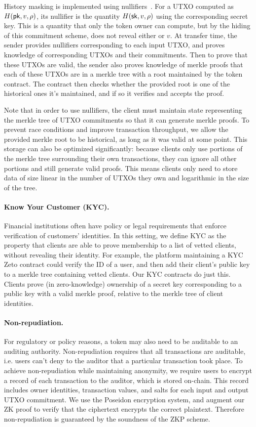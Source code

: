 History masking is implemented using nullifiers~\cite{TODO}. For a UTXO computed as $H(\mathsf{pk}, v, \rho)$, its nullifier is the quantity $H(\mathsf{sk}, v, \rho)$ using the corresponding secret key. This is a quantity that only the token owner can compute, but by the hiding of this commitment scheme, does not reveal either \sk or $v$. At transfer time, the sender provides nullifiers corresponding to each input UTXO, and proves knowledge of corresponding UTXOs and their commitments. Then to prove that these UTXOs are valid, the sender also proves knowledge of merkle proofs that each of these UTXOs are in a merkle tree with a root maintained by the token contract. The contract then checks whether the provided root is one of the historical ones it's maintained, and if so it verifies and accepts the proof.

Note that in order to use nullifiers, the client must maintain state representing the merkle tree of UTXO commitments so that it can generate merkle proofs. To prevent race conditions and improve transaction throughput, we allow the provided merkle root to be historical, as long as it was valid at some point. This storage can also be optimized significantly: because clients only use portions of the merkle tree surrounding their own transactions, they can ignore all other portions and still generate valid proofs. This means clients only need to store data of size linear in the number of UTXOs they own and logarithmic in the size of the tree.

\paragraph{Know Your Customer (KYC).} Financial institutions often have policy or legal requirements that enforce verification of customers' identities. In this setting, we define KYC as the property that clients are able to prove membership to a list of vetted clients, without revealing their identity. For example, the platform maintaining a KYC Zeto contract could verify the ID of a user, and then add their client's public key to a merkle tree containing vetted clients. Our KYC contracts do just this. Clients prove (in zero-knowledge) ownership of a secret key corresponding to a public key with a valid merkle proof, relative to the merkle tree of client identities.

\paragraph{Non-repudiation.} For regulatory or policy reasons, a token may also need to be auditable to an auditing authority. Non-repudiation requires that all transactions are auditable, i.e. users can't deny to the auditor that a particular transaction took place. To achieve non-repudiation while maintaining anonymity, we require users to encrypt a record of each transaction to the auditor, which is stored on-chain. This record includes owner identities, transaction values, and salts for each input and output UTXO commitment. We use the Poseidon encryption system, and augment our ZK proof to verify that the ciphertext encrypts the correct plaintext. Therefore non-repudiation is guaranteed by the soundness of the ZKP scheme.

